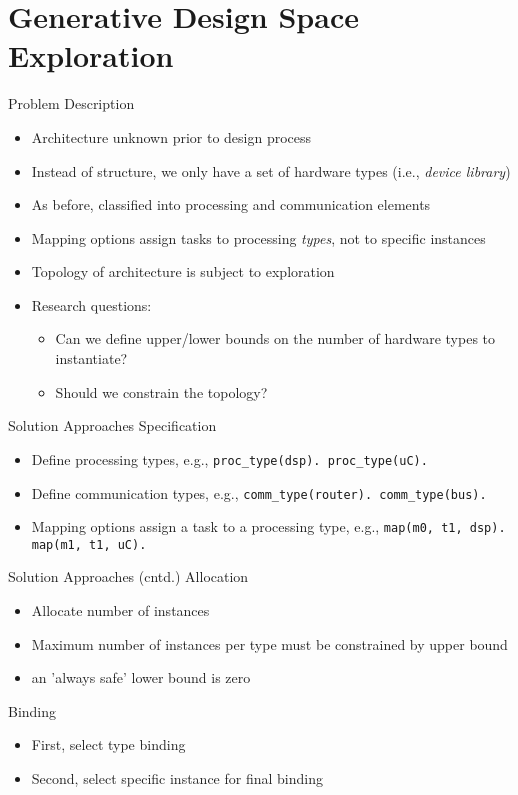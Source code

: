 \documentclass[11pt]{beamer}
\begin{document}
\section{Generative Design Space Exploration}

\begin{frame}{Problem Description}
  \begin{itemize}
    \item Architecture unknown prior to design process
    \item Instead of structure, we only have a set of hardware types (i.e., \textit{device library})
    \item As before, classified into processing and communication elements
    \item Mapping options assign tasks to processing \textit{types}, not to specific instances
    \item Topology of architecture is subject to exploration 
    \item Research questions:
    \begin{itemize}
      \item Can we define upper/lower bounds on the number of hardware types to instantiate?
      \item Should we constrain the topology? 
    \end{itemize}
  \end{itemize}
\end{frame}

\begin{frame}{Solution Approaches }
  Specification
  \begin{itemize} 
     \item Define processing types, e.g., \texttt{proc\_type(dsp). proc\_type(uC).}
     \item Define communication types, e.g., \texttt{comm\_type(router). comm\_type(bus).}
     \item Mapping options assign a task to a processing type, e.g., \texttt{map(m0, t1, dsp). map(m1, t1, uC).}
  \end{itemize}
\end{frame}

\begin{frame}{Solution Approaches (cntd.)}
    Allocation
  \begin{itemize} 
     \item Allocate number of instances
     \item Maximum number of instances per type must be constrained by upper bound
     \item an 'always safe' lower bound is zero
  \end{itemize}

  Binding
  \begin{itemize} 
     \item First, select type binding 
     \item Second, select specific instance for final binding
  \end{itemize}
\end{frame}
\end{document}
